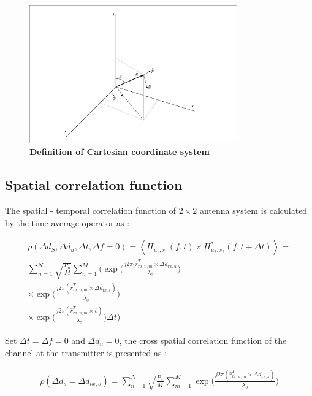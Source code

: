 \documentclass{article} %
\begin{document}
\begin{figure}[htbp]
    \centering
    \includegraphics[width=0.8\textwidth, clip, trim=5 5 5 5]{Figure 7.1.1.pdf}
    \caption[Definition of Cartesian coordinate system~\cite{ETSI5G}]{\bfseries \fontsize{12pt}{0pt}\selectfont Definition of Cartesian coordinate system~\cite{ETSI5G}}
    \label{coordinate}
\end{figure}

\subsection{Spatial correlation function}

The spatial - temporal correlation function of $2 \times 2$ antenna system is calculated by the time average operator as \cite{final_exam}:

\begin{adjustwidth}{-2cm}{0cm}
\begin{equation} \label{ptTQ}
\begin{split}
    \rho(\Delta d_S, \Delta d_u, \Delta t, \Delta f = 0)=\left\langle H_{u_1, s_1}(f,t) \times H_{u_2, s_2}^* (f,t+\Delta t) \right\rangle = \\
    \sum_{n=1}^{N}\sqrt{\frac{P_n}{M}}\sum_{n=1}^M
    \Bigg(
    \exp \Big( \frac{j2\pi(\hat{r}_{rx,n,m}^T \times \Delta \overline d_{rx,u}}{\lambda_0} \Big) \\
    \times \exp \Big( \frac{j2\pi(\hat{r}_{rx,n,m}^T \times \Delta \overline d_{tx,s})}{\lambda_0} \Big) \\
    \times \exp \Big( \frac{j2\pi(\hat{r}_{rx,n,m}^T \times \overline{v})}{\lambda_0} \Big)\Delta t
    \Bigg)
\end{split}
\end{equation}
\end{adjustwidth}

Set $\Delta t = \Delta f = 0$ and $\Delta d_u = 0$, the cross spatial correlation function of the channel at the transmitter is presented as \cite{final_exam}: 
\begin{adjustwidth}{-2cm}{0cm}
\begin{equation} \label{ptBS} 
\begin{split}
    \rho(\Delta d_s = \Delta \overline d_{tx,s}) = \sum_{n=1}^N \sqrt{\frac{P_n}{M}} \sum_{m=1}^M \exp \Big(\frac{j2\pi(\hat{r}_{tx,n,m}^T \times \Delta \overline{d}_{tx,s})}{\lambda_0} \Big)
\end{split}
\end{equation}
\end{adjustwidth}
\end{document}
